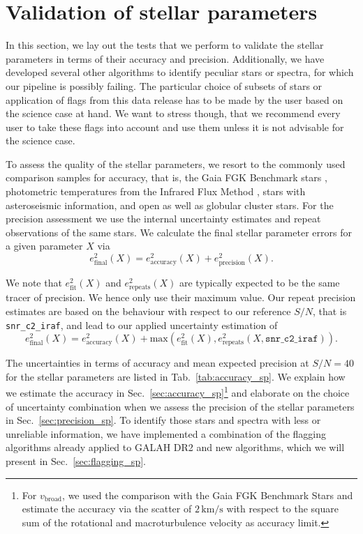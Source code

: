 \documentclass[fleqn,usenatbib,useAMS]{mnras}
\newcommand{\vbroad}{$v_\mathrm{broad}$\xspace}
\begin{document}
\section{Validation of stellar parameters} \label{sec:validation_sp}

In this section, we lay out the tests that we perform to validate the stellar parameters in terms of their accuracy and precision. Additionally, we have developed several other algorithms to identify peculiar stars or spectra, for which our pipeline is possibly failing. The particular choice of subsets of stars or application of flags from this data release has to be made by the user based on the science case at hand. We want to stress though, that we recommend every user to take these flags into account and use them unless it is not advisable for the science case.
	
To assess the quality of the stellar parameters, we resort to the commonly used comparison samples for accuracy, that is, the Gaia FGK Benchmark stars \citep[GBS][]{Heiter2015, Jofre2014, Jofre2015, Hawkins2016, Jofre2018a}, photometric temperatures from the Infrared Flux Method \citep[IRFM][]{Casagrande2010, Casagrande2014}, stars with asteroseismic information, and open as well as globular cluster stars. For the precision assessment we use the internal uncertainty estimates and repeat observations of the same stars.  We calculate the final stellar parameter errors for a given parameter $X$ via 
\begin{equation}
e_\text{final}^2 (X) = e_\text{accuracy}^2(X) + e_\text{precision}^2(X). \label{eq:usual_final_error}
\end{equation}

We note that $e_\text{fit}^2(X)$ and $e_\text{repeats}^2(X)$ are typically expected to be the same tracer of precision. We hence only use their maximum value. Our repeat precision estimates are based on the behaviour with respect to our reference $S/N$, that is \texttt{snr\_c2\_iraf}, and lead to our applied uncertainty estimation of
\begin{equation}
e_\text{final}^2 (X) = e_\text{accuracy}^2(X) + \text{max} \left(e_\text{fit}^2(X), e_\text{repeats}^2(X, \texttt{snr\_c2\_iraf}) \right). \label{eq:final_error}
\end{equation}

The uncertainties in terms of accuracy and mean expected precision at $S/N = 40$ for the stellar parameters are listed in Tab.~\ref{tab:accuracy_sp}. We explain how we estimate the accuracy in Sec.~\ref{sec:accuracy_sp}\footnote{For \vbroad, we used the comparison with the Gaia FGK Benchmark Stars and estimate the accuracy via the scatter of $2\,\mathrm{km/s}$ with respect to the square sum of the rotational and macroturbulence velocity as accuracy limit.} and elaborate on the choice of uncertainty combination when we assess the precision of the stellar parameters in Sec.~\ref{sec:precision_sp}. To identify those stars and spectra with less or unreliable information, we have implemented a combination of the flagging algorithms already applied to GALAH DR2 \citep[see][]{Buder2018} and new algorithms, which we will present in Sec.~\ref{sec:flagging_sp}.
\end{document}
